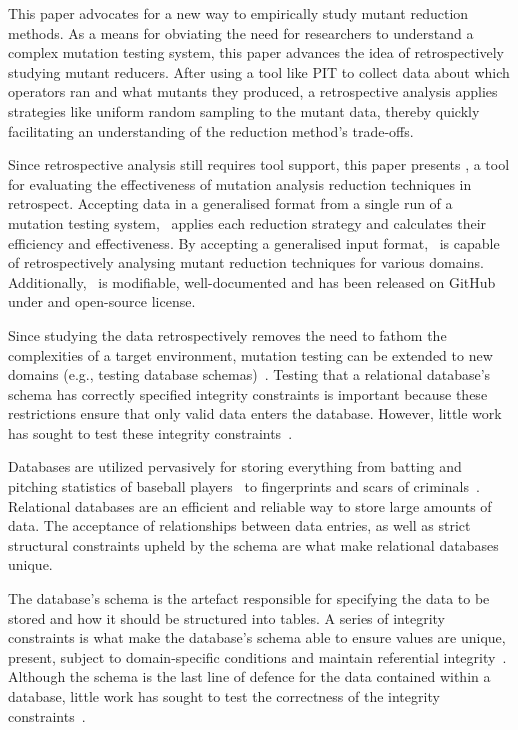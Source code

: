 
This paper advocates for a new way to empirically study mutant reduction methods. As a means for obviating the need for
researchers to understand a complex mutation testing system, this paper advances the idea of retrospectively studying
mutant reducers.  After using a tool like PIT to collect data about which operators ran and what mutants they produced,
a retrospective analysis applies strategies like uniform random sampling to the mutant data, thereby quickly
facilitating an understanding of the reduction method's trade-offs.

Since retrospective analysis still requires tool support, this paper presents \mr, a tool for evaluating the
effectiveness of mutation analysis reduction techniques in retrospect. Accepting data in a generalised format from a
single run of a mutation testing system, \mr~applies each reduction strategy and calculates their efficiency and
effectiveness.  By accepting a generalised input format, \mr~is capable of retrospectively analysing mutant reduction
techniques for various domains.  Additionally, \mr~is modifiable, well-documented and has been released on GitHub under
and open-source license.

Since studying the data retrospectively removes the need to fathom the complexities of a target environment, mutation
testing can be extended to new domains (e.g., testing database schemas)~\cite{mcminn2016virtual,
mcminn2015effectiveness, wright2013efficient}.  Testing that a relational database's schema has correctly specified
integrity constraints is important because these restrictions ensure that only valid data enters the database. However,
little work has sought to test these integrity constraints~\cite{mcminn2016virtual}.

Databases are utilized pervasively for storing everything from batting and pitching statistics of baseball
players~\cite{lahmanbaseball} to fingerprints and scars of criminals~\cite{ngi}.  Relational databases are an efficient
and reliable way to store large amounts of data.  The acceptance of relationships between data entries, as well as
strict structural constraints upheld by the schema are what make relational databases unique.

The database's schema is the artefact responsible for specifying the data to be stored and how it should be structured
into tables. A series of integrity constraints is what make the database's schema able to ensure values are unique,
present, subject to domain-specific conditions and maintain referential integrity~\cite{mcminn2016virtual}.  Although
the schema is the last line of defence for the data contained within a database, little work has sought to test the
correctness of the integrity constraints~\cite{mcminn2015effectiveness}.

